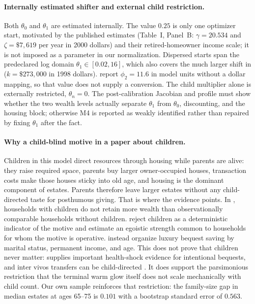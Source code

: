 \documentclass[10pt]{article}
\begin{document}
\paragraph{Internally estimated shifter and external child restriction.}
Both $\theta_0$ and $\theta_1$ are estimated internally. The value $0.25$ is
only one optimizer start, motivated by the published \citet{nakajima2017}
estimates (Table~I, Panel~B: $\gamma=20.534$ and $\zeta=\$7{,}619$ per year
in 2000 dollars) and their retired-homeowner income scale; it is not imposed
as a parameter in our normalization. Dispersed starts span the predeclared
log domain $\theta_1\in[0.02,16]$, which also covers the much larger shift in
\citet[eq.~(3), Table~3]{denardifrenchjones2010} ($k=\$273{,}000$ in 1998
dollars). \citet[eq.~(8), Table~4]{denardi2004} report $\phi_2=11.6$ in model
units without a dollar mapping, so that value does not supply a conversion.
The child multiplier alone is externally restricted, $\theta_n=0$. The
post-calibration Jacobian and profile must show whether the two wealth levels
actually separate $\theta_1$ from $\theta_0$, discounting, and the housing
block; otherwise M4 is reported as weakly identified rather than repaired by
fixing $\theta_1$ after the fact.

\paragraph{Why a child-blind motive in a paper about children.} Children in
this model direct resources through housing while parents are alive: they
raise required space, parents buy larger owner-occupied houses, transaction
costs make those houses sticky into old age, and housing is the dominant
component of estates. Parents therefore leave larger estates without any
child-directed taste for posthumous giving. That is where the evidence points.
In \citet[Tables~4--5]{hurd1989}, households with children do not retain more
wealth than observationally comparable households without children.
\citet[pp.~208--209 and Tables~3--4]{kopczuk2007} reject children as a
deterministic indicator of the motive and estimate an egoistic strength common
to households for whom the motive is operative. \citet[pp.~750, 789]{denardi2025}
instead organize luxury bequest saving by marital status, permanent income,
and age. This does not prove that children never matter:
\citet{kvaerner2023} supplies important health-shock evidence for intentional
bequests, and inter vivos transfers can be child-directed
\citep{mcgarry1999}. It does support the parsimonious restriction that the
terminal warm glow itself does not scale mechanically with child count. Our
own sample reinforces that restriction: the family-size gap in median estates
at ages 65--75 is $0.101$ with a bootstrap standard error of $0.563$.
\end{document}
